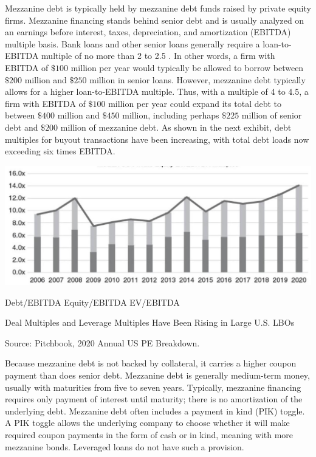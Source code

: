 \documentclass[11pt]{article}
\begin{document}
Mezzanine debt is typically held by mezzanine debt funds raised by private equity firms. Mezzanine financing stands behind senior debt and is usually analyzed on an earnings before interest, taxes, depreciation, and amortization (EBITDA) multiple basis. Bank loans and other senior loans generally require a loan-to-EBITDA multiple of no more than 2 to 2.5 . In other words, a firm with EBITDA of $\$ 100$ million per year would typically be allowed to borrow between $\$ 200$ million and $\$ 250$ million in senior loans. However, mezzanine debt typically allows for a higher loan-to-EBITDA multiple. Thus, with a multiple of 4 to 4.5, a firm with EBITDA of $\$ 100$ million per year could expand its total debt to between $\$ 400$ million and $\$ 450$ million, including perhaps $\$ 225$ million of senior debt and $\$ 200$ million of mezzanine debt. As shown in the next exhibit, debt multiples for buyout transactions have been increasing, with total debt loads now exceeding six times EBITDA.

\begin{center}
\includegraphics[max width=\textwidth]{2024_04_10_62fc48f41306c58a4ec6g-4}
\end{center}

Debt/EBITDA Equity/EBITDA EV/EBITDA

Deal Multiples and Leverage Multiples Have Been Rising in Large U.S. LBOs

Source: Pitchbook, 2020 Annual US PE Breakdown.

Because mezzanine debt is not backed by collateral, it carries a higher coupon payment than does senior debt. Mezzanine debt is generally medium-term money, usually with maturities from five to seven years. Typically, mezzanine financing requires only payment of interest until maturity; there is no amortization of the underlying debt. Mezzanine debt often includes a payment in kind (PIK) toggle. A PIK toggle allows the underlying company to choose whether it will make required coupon payments in the form of cash or in kind, meaning with more mezzanine bonds. Leveraged loans do not have such a provision.
\end{document}
